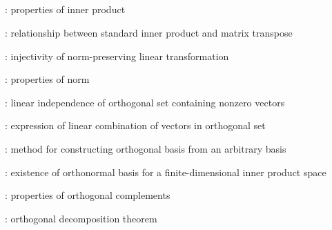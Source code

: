 \subsection*{}
\item {}: properties of inner product
\item {}: relationship between standard inner product and matrix transpose
\item {}: injectivity of norm-preserving linear transformation
\item {}: properties of norm
\item {}: linear independence of orthogonal set containing nonzero vectors
\item {}: expression of linear combination of vectors in orthogonal set
\item {}: method for constructing orthogonal basis from an arbitrary basis
\item {}: existence of orthonormal basis for a finite-dimensional inner product space
\item {}: properties of orthogonal complements
\item {}: orthogonal decomposition theorem
